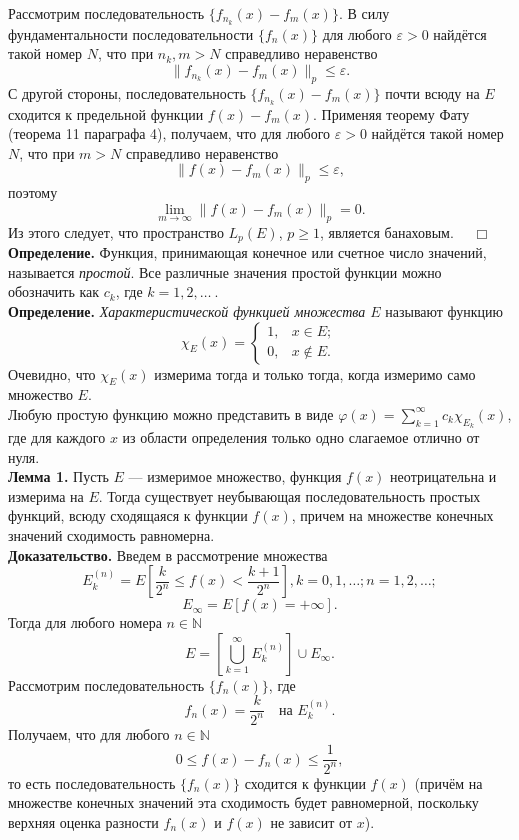 \documentclass[12pt,a4paper, titlepage]{article}
\begin{document}
Рассмотрим последовательность $\lbrace f_{n_k}(x) - f_m(x) \rbrace$. В силу фундаментальности последовательности $\lbrace f_n(x) \rbrace$ для любого $\varepsilon > 0$ найдётся такой номер $N$, что при $n_k, m > N$ справедливо неравенство
$$
\|f_{n_k}(x) - f_m(x)\|_p \leqslant \varepsilon.
$$
С другой стороны, последовательность $\lbrace f_{n_k}(x) - f_m(x) \rbrace$ почти всюду на $E$ сходится к предельной функции $f(x) - f_m(x)$. Применяя теорему Фату (теорема 11 параграфа 4), получаем, что для любого $\varepsilon > 0$ найдётся такой номер $N$, что при $m > N$ справедливо неравенство
$$
\|f(x) - f_m(x)\|_p \leqslant \varepsilon,
$$
поэтому
$$
\lim_{m\to\infty} \|f(x) - f_m(x)\|_p = 0.
$$
Из этого следует, что пространство $L_p(E)$, $p \geqslant 1$, является банаховым. $\quad \Box$\\












\textbf{Определение.} Функция, принимающая конечное или счетное число значений, называется \textit{простой}. Все различные значения простой функции можно обозначить как $c_k$, где $k = 1, 2, \dots \ .$\\

\textbf{Определение.} \textit{Характеристической функцией множества $E$} называют функцию
$$
\chi_E(x) = 
\begin{cases}
1, &x\in E; \\
0, &x\notin E.
\end{cases}
$$
Очевидно, что $\chi_E(x)$ измерима тогда и только тогда, когда измеримо само множество $E$.\\

Любую простую функцию можно представить в виде $\varphi (x) = \sum\limits_{k=1}^\infty c_k \chi_{E_k}(x)$, где для каждого $x$ из области определения только одно слагаемое отлично от нуля.\\

\textbf{Лемма 1.} Пусть $E$ --- измеримое множество, функция $f(x)$ неотрицательна и измерима на $E$. Тогда существует неубывающая последовательность простых функций, всюду сходящаяся к функции $f(x)$, причем на множестве конечных значений сходимость равномерна.\\
\textbf{Доказательство.} Введем в рассмотрение множества
$$
E_k^{(n)} = E \left[ \frac k {2^n} \leqslant f(x) < \frac {k+1}{2^n} \right], k = 0, 1, \dots; n = 1, 2, \dots;
$$
$$
E_\infty = E [ f(x) = + \infty].
$$
Тогда для любого номера $n \in \mathbb{N}$
$$
E = \left[ \bigcup_{k=1}^\infty E_k^{(n)} \right] \cup E_\infty.
$$
Рассмотрим последовательность $\lbrace f_n(x) \rbrace$, где
$$
f_n(x) = \frac k {2^n} \quad \mbox{на } E_k^{(n)}.
$$
Получаем, что для любого $n \in \mathbb{N}$
$$
0 \leqslant f(x) - f_n(x) \leqslant \frac 1 {2^n},
$$
то есть последовательность $\lbrace f_n(x) \rbrace$ сходится к функции $f(x)$ (причём на множестве конечных значений эта сходимость будет равномерной, поскольку верхняя оценка разности $f_n(x)$ и $f(x)$ не зависит от $x$).\\
\end{document}
